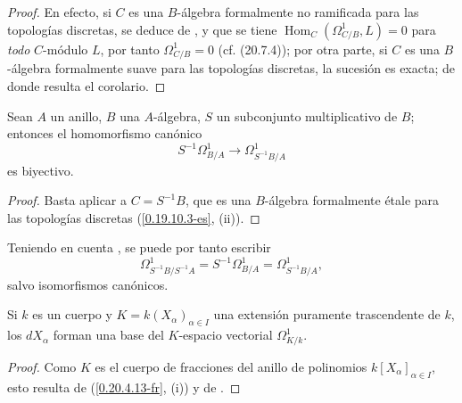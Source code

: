 \begin{proof}
En efecto, si $C$ es una $B$-álgebra formalmente no ramificada para las
topologías discretas, se deduce de ,
 y  que se tiene
$\operatorname{Hom}_C(\Omega^1_{C/B},L)=0$ para \emph{todo} $C$-módulo $L$, por tanto
$\Omega^1_{C/B}=0$ (cf. (20.7.4)); por otra parte, si $C$ es una
$B$-álgebra formalmente suave para las topologías discretas, la sucesión
 es exacta; de donde resulta el corolario.
\end{proof}

\begin{corollary}[20.5.9]
\label{0.20.5.9-fr}
Sean $A$ un anillo, $B$ una $A$-álgebra, $S$ un subconjunto multiplicativo de
$B$; entonces el homomorfismo canónico
\begin{equation}
\tag{20.5.9.1}
\label{0.20.5.9.1-fr}
  S^{-1}\Omega^1_{B/A}\to\Omega^1_{S^{-1}B/A}
\end{equation}
es biyectivo.
\end{corollary}

\begin{proof}
Basta aplicar  a $C=S^{-1}B$, que es una
$B$-álgebra formalmente étale para las topologías discretas
(\ref{0.19.10.3-es}, (ii)).
\end{proof}

Teniendo en cuenta , se puede por tanto escribir
\begin{equation}
\tag{20.5.9.2}
\label{0.20.5.9.2-fr}
  \Omega^1_{S^{-1}B/S^{-1}A}
  =S^{-1}\Omega^1_{B/A}
  =\Omega^1_{S^{-1}B/A},
\end{equation}
salvo isomorfismos canónicos.

\begin{corollary}[20.5.10]
\label{0.20.5.10-fr}
Si $k$ es un cuerpo y $K=k(X_\alpha)_{\alpha\in I}$ una extensión puramente trascendente de
$k$, los $dX_\alpha$ forman una base del $K$-espacio vectorial
$\Omega^1_{K/k}$.
\end{corollary}

\begin{proof}
Como $K$ es el cuerpo de fracciones del anillo de polinomios
$k[X_\alpha]_{\alpha\in I}$, esto resulta de (\ref{0.20.4.13-fr}, (i)) y de
.
\end{proof}

